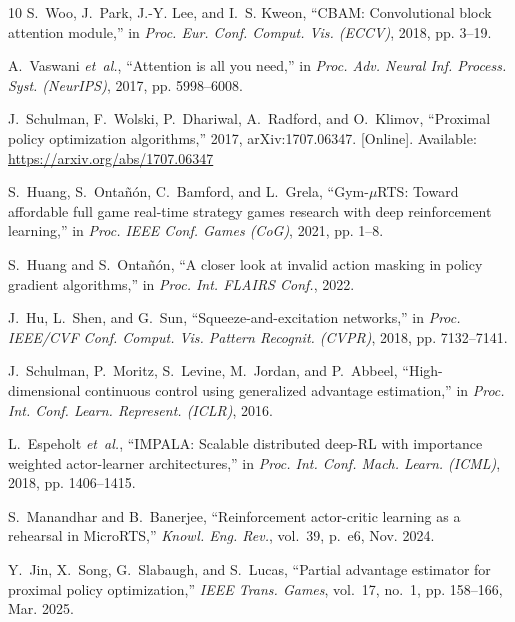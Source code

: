 \documentclass[conference]{IEEEtran}
\begin{document}
\begin{thebibliography}{10}
S.~Woo, J.~Park, J.-Y. Lee, and I.~S. Kweon, ``{CBAM}: Convolutional block
  attention module,'' in \emph{Proc. Eur. Conf. Comput. Vis. ({ECCV})}, 2018,
  pp. 3--19.

A.~Vaswani \emph{et~al.}, ``Attention is all you need,'' in \emph{Proc. Adv.
  Neural Inf. Process. Syst. ({NeurIPS})}, 2017, pp. 5998--6008.

\BIBentryALTinterwordspacing
J.~Schulman, F.~Wolski, P.~Dhariwal, A.~Radford, and O.~Klimov, ``Proximal
  policy optimization algorithms,'' 2017, arXiv:1707.06347. [Online].
  Available: \url{https://arxiv.org/abs/1707.06347}
\BIBentrySTDinterwordspacing

S.~Huang, S.~Onta{\~n}{\'o}n, C.~Bamford, and L.~Grela, ``Gym-{$\mu$RTS}:
  Toward affordable full game real-time strategy games research with deep
  reinforcement learning,'' in \emph{Proc. {IEEE} Conf. Games ({CoG})}, 2021,
  pp. 1--8.

S.~Huang and S.~Onta{\~n}{\'o}n, ``A closer look at invalid action masking in
  policy gradient algorithms,'' in \emph{Proc. Int. {FLAIRS} Conf.}, 2022.

J.~Hu, L.~Shen, and G.~Sun, ``Squeeze-and-excitation networks,'' in \emph{Proc.
  {IEEE/CVF} Conf. Comput. Vis. Pattern Recognit. ({CVPR})}, 2018, pp.
  7132--7141.

J.~Schulman, P.~Moritz, S.~Levine, M.~Jordan, and P.~Abbeel, ``High-dimensional
  continuous control using generalized advantage estimation,'' in \emph{Proc.
  Int. Conf. Learn. Represent. ({ICLR})}, 2016.

L.~Espeholt \emph{et~al.}, ``{IMPALA}: Scalable distributed deep-{RL} with
  importance weighted actor-learner architectures,'' in \emph{Proc. Int. Conf.
  Mach. Learn. ({ICML})}, 2018, pp. 1406--1415.

S.~Manandhar and B.~Banerjee, ``Reinforcement actor-critic learning as a
  rehearsal in {MicroRTS},'' \emph{Knowl. Eng. Rev.}, vol.~39, p.~e6, Nov.
  2024.

Y.~Jin, X.~Song, G.~Slabaugh, and S.~Lucas, ``Partial advantage estimator for
  proximal policy optimization,'' \emph{{IEEE} Trans. Games}, vol.~17, no.~1,
  pp. 158--166, Mar. 2025.


\end{thebibliography}
\end{document}
